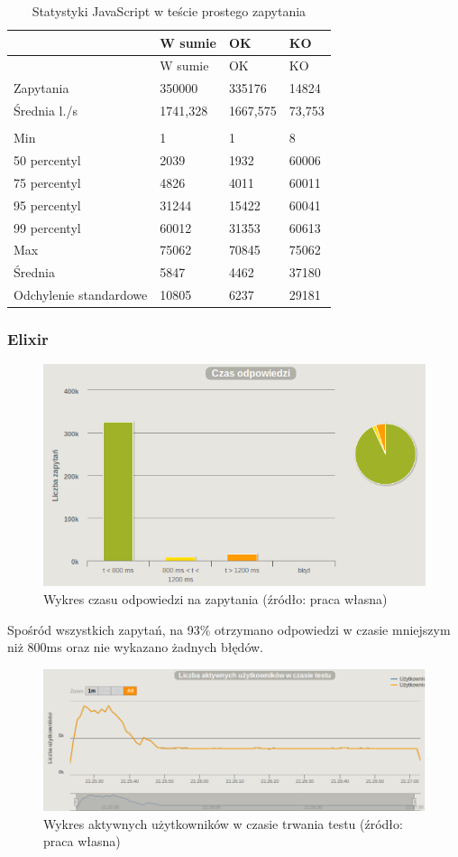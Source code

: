 \documentclass[12pt,twoside]{article}
\begin{document}
\begin{longtable}[c]{@{}llll@{}}
\caption{Statystyki JavaScript w teście prostego
zapytania}\tabularnewline
\toprule
& W sumie & OK & KO\tabularnewline
\midrule
\endfirsthead
\toprule
& W sumie & OK & KO\tabularnewline
\midrule
\endhead
Zapytania & 350000 & 335176 & 14824\tabularnewline
Średnia l./s & 1741,328 & 1667,575 & 73,753\tabularnewline
& & &\tabularnewline
Min & 1 & 1 & 8\tabularnewline
50 percentyl & 2039 & 1932 & 60006\tabularnewline
75 percentyl & 4826 & 4011 & 60011\tabularnewline
95 percentyl & 31244 & 15422 & 60041\tabularnewline
99 percentyl & 60012 & 31353 & 60613\tabularnewline
Max & 75062 & 70845 & 75062\tabularnewline
Średnia & 5847 & 4462 & 37180\tabularnewline
Odchylenie standardowe & 10805 & 6237 & 29181\tabularnewline
\bottomrule
\end{longtable}

\clearpage

\subsubsection{Elixir}\label{elixir}

\begin{figure}[htbp]
\centering
\includegraphics[resolution=150]{test_results/elixir/simpletest/screenshots/response_times.png}
\caption{Wykres czasu odpowiedzi na zapytania (źródło: praca własna)}
\end{figure}

Spośród wszystkich zapytań, na 93\% otrzymano odpowiedzi w czasie
mniejszym niż 800ms oraz nie wykazano żadnych błędów.

\begin{figure}[htbp]
\centering
\includegraphics[resolution=150]{test_results/elixir/simpletest/screenshots/active_users.png}
\caption{Wykres aktywnych użytkowników w czasie trwania testu (źródło: praca własna)}
\end{figure}
\end{document}
